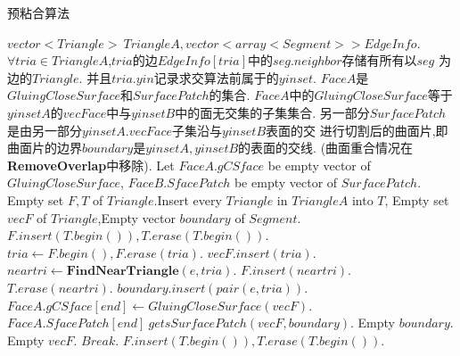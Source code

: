 \documentclass[a4paper]{book}
\renewcommand{\algorithmicrequire}{\textbf{输入:}}
\renewcommand{\algorithmicensure}{\textbf{输出:}}
\renewcommand{\algorithmicrequire}{\textbf{Input : }}
\renewcommand{\algorithmicrequire}{\textbf{Precondition : }}
\renewcommand{\algorithmicensure}{\textbf{Output : }}
\renewcommand{\algorithmicensure}{\textbf{Postcondition : }}
\numberwithin{equation}{chapter}
\theoremstyle{definition}
\begin{document}
\begin{algorithm}
	\caption{预粘合算法}
	\begin{algorithmic}[1]
		\renewcommand{\algorithmicrequire}{\textbf{Input : }}
		\Require $vector<Triangle>\ TriangleA, vector<array<Segment>> EdgeInfo$.
		\renewcommand{\algorithmicrequire}{\textbf{Precondition : }}
		\Require $\forall tria \in TriangleA$,$tria$的边$EdgeInfo[tria]$中的$seg.neighbor$存储有所有以$seg$
		为边的$Triangle$. 并且$tria.yin$记录求交算法前属于的$yinset$.
		\renewcommand{\algorithmicensure}{\textbf{Output : }}
		\Ensure $FaceA$是$GluingCloseSurface$和$SurfacePatch$的集合.
		\renewcommand{\algorithmicensure}{\textbf{Postcondition : }}
		\Ensure $FaceA$中的$GluingCloseSurface$等于
		$yinsetA$的$vecFace$中与$yinsetB$中的面无交集的子集集合.
		另一部分$SurfacePatch$是由另一部分$yinsetA.vecFace$子集沿与$yinsetB$表面的交
		进行切割后的曲面片,即曲面片的边界$boundary$是$yinsetA,yinsetB$的表面的交线.
		(曲面重合情况在\textbf{RemoveOverlap}中移除).
		\State Let $FaceA.gCSface$ be empty vector of $GluingCloseSurface$,
		$FaceB.SfacePatch$ be empty vector of $SurfacePatch$.
		\State Empty set $F,T$ of $Triangle$.Insert every $Triangle$ in $TriangleA$ into $T$,
		\State Empty set $vecF$ of $Triangle$,Empty vector $boundary$ of $Segment$. 
		\State $F.insert(T.begin()), T.erase(T.begin())$.
		\State $tria \gets F.begin(),F.erase(tria)$.
		\State $vecF.insert(tria)$.
		\State $neartri \gets \textbf{FindNearTriangle}(e,tria)$.
		\State $F.insert(neartri)$.
		\State $T.erase(neartri)$.
		\EndIf
		\Else
		\State $boundary.insert(pair(e,tria))$.
		\EndIf
		\EndFor
		\State $FaceA.gCSface[end] \gets GluingCloseSurface(vecF)$.
		\Else 
		\State $FaceA.SfacePatch[end] \ gets SurfacePatch(vecF,boundary)$.
		\State Empty $boundary$.
		\EndIf
		\State Empty $vecF$.
		\State $Break$.
		\EndIf
		\State $F.insert(T.begin()), T.erase(T.begin())$.
		\EndIf
		\EndWhile
		\EndFunction
	\end{algorithmic}
\end{algorithm}
\end{document}
